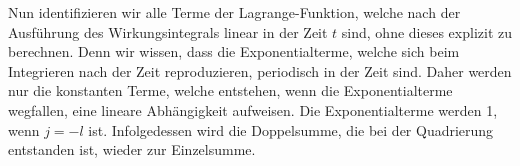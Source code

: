       \iffalse
      \begin{align}
        \begin{split}
          L &= \frac{1}{2}m\dot \zeta(t)^2 - \frac{1}{2}m\omega_0^2\zeta(t)^2 + S(t)\zeta(t) \\
           &=\frac{-\omega^2}{2m} \sum_j \sum_l \frac{jc_j}{\omega_0^2-j^2\omega^2} \frac{lc_l}{\omega_0^2-l^2\omega^2} \text e^{\text i(j+l)\omega t}\\
           &\quad-\frac{\omega_0^2}{2m} \sum_j \sum_l \frac{c_j}{\omega_0^2-j^2\omega^2} \frac{c_l}{\omega_0^2-l^2\omega^2} \text e^{\text i(j+l)\omega t}\\
           &\quad + \frac{1}{m} \sum_j \sum_l \frac{c_jc_l}{\omega_0^2-j^2\omega^2} \text e^{\text i(j+l)\omega t}\; , \; j,l \in \mathbb{Z} \; .
         \end{split}
       \end{align}
       \fi
\iffalse
       Nun identifizieren wir alle Terme der Lagrange-Funktion, welche nach der Ausführung des Wirkungsintegrals linear in der Zeit $t$ sind, ohne dieses explizit zu berechnen.
       Denn wir wissen, dass die Exponentialterme, welche sich beim Integrieren nach der Zeit reproduzieren, periodisch in der Zeit sind.
       Daher werden nur die konstanten Terme, welche entstehen, wenn die Exponentialterme wegfallen, eine lineare Abhängigkeit aufweisen.
       Die Exponentialterme werden 1, wenn $j=-l$ ist.
       Infolgedessen wird die Doppelsumme, die bei der Quadrierung entstanden ist, wieder zur Einzelsumme.


